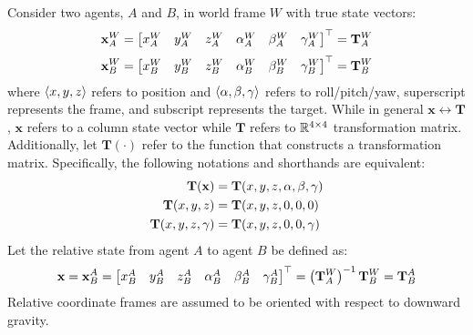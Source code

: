 \documentclass[12pt,letterpaper]{article}
\begin{document}
Consider two agents, $A$ and $B$, in world frame $W$ with true state vectors:
$$\mathbf{x}^{W}_{A} = \begin{bmatrix} x^{W}_{A} & y^{W}_{A} & z^{W}_{A} & \alpha^{W}_{A} & \beta^{W}_{A} & \gamma^{W}_{A} \end{bmatrix}^\top = \mathbf{T}^{W}_{A}$$
$$\mathbf{x}^{W}_{B} = \begin{bmatrix} x^{W}_{B} & y^{W}_{B} & z^{W}_{B} & \alpha^{W}_{B} & \beta^{W}_{B} & \gamma^{W}_{B} \end{bmatrix}^\top = \mathbf{T}^{W}_{B}$$
where $\langle x,y,z\rangle$ refers to position and $\langle\alpha, \beta, \gamma\rangle$ refers to roll/pitch/yaw, superscript represents the frame, and subscript represents the target. While in general $\mathbf{x} \leftrightarrow \mathbf{T}$, $\mathbf{x}$ refers to a column state vector while $\mathbf{T}$ refers to $\mathbb{R}^{4\times 4}$ transformation matrix. Additionally, let $\mathbf{T}(\cdot)$ refer to the function that constructs a transformation matrix. Specifically, the following notations and shorthands are equivalent:
\begin{align*}
\mathbf{T}(\mathbf{x}) &= \mathbf{T}(x, y, z, \alpha, \beta, \gamma) \\
\mathbf{T}(x, y, z) &= \mathbf{T}(x, y, z, 0, 0, 0) \\
\mathbf{T}(x, y, z, \gamma) &= \mathbf{T}(x, y, z, 0, 0, \gamma)
\end{align*}
Let the relative state from agent $A$ to agent $B$ be defined as:
$$\mathbf{x} = \mathbf{x}^{A}_{B} = \begin{bmatrix} x^{A}_{B} & y^{A}_{B} & z^{A}_{B} & \alpha^{A}_{B} & \beta^{A}_{B} & \gamma^{A}_{B} \end{bmatrix}^\top = \left(\mathbf{T}^{W}_{A}\right)^{-1} \mathbf{T}^{W}_{B} = \mathbf{T}^{A}_{B}$$
Relative coordinate frames are assumed to be oriented with respect to downward gravity.
\end{document}
